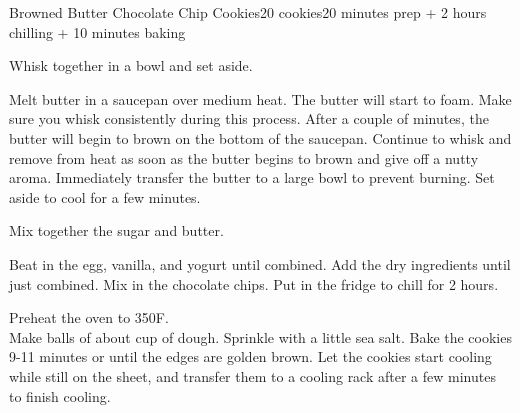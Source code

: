 \documentclass[../Cookbook.tex]{subfiles}
\begin{document}
\begin{recipe}{Browned Butter Chocolate Chip Cookies}{20 cookies}{20 minutes prep + 2 hours chilling + 10 minutes baking}

Whisk together in a bowl and set aside.

Melt butter in a saucepan over medium heat. The butter will start to foam. Make sure you whisk consistently during this process. After a couple of minutes, the butter will begin to brown on the bottom of the saucepan. Continue to whisk and remove from heat as soon as the butter begins to brown and give off a nutty aroma. Immediately transfer the butter to a large bowl to prevent burning. Set aside to cool for a few minutes.

Mix together the sugar and butter.

Beat in the egg, vanilla, and yogurt until combined. Add the dry ingredients until just combined. Mix in the chocolate chips. Put in the fridge to chill for 2 hours.

Preheat the oven to 350\0F.\\
Make balls of about  cup of dough. Sprinkle with a little sea salt.
Bake the cookies 9-11 minutes or until the edges are golden brown. Let the cookies start cooling while still on the sheet, and transfer them to a cooling rack after a few minutes to finish cooling.


\end{recipe}
\end{document}
